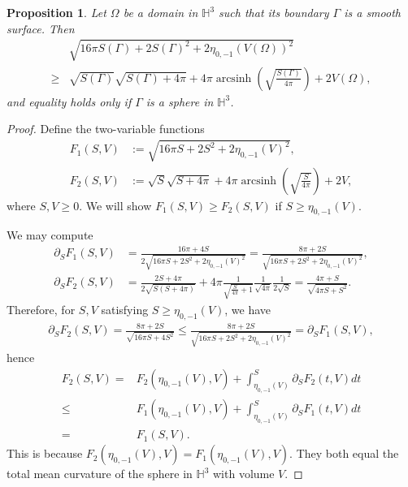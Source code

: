 \documentclass[10pt,a4paper]{amsart}
\newtheorem{prop}{Proposition}
\newcommand{\HH}{\mathbb{H}}
\newcommand{\p}{\partial}
\begin{document}
		\begin{prop}\label{prop:compare-inequality}
			Let $\Omega$ be a domain in $\HH^3$ such that its boundary $\Gamma$ is a smooth surface. Then
			\begin{align}
				\label{note2.prop}
				&\sqrt{16\pi S(\Gamma)+ 2 S(\Gamma)^2 + 2  \eta_{0,-1}(V(\Omega))^2} 
				\\
				\nonumber
				\geq
				&
				\sqrt{S(\Gamma)}\sqrt{S(\Gamma)+4\pi} + 4\pi \operatorname{arcsinh}\left( \sqrt{\frac{S(\Gamma)}{4\pi}} \right)
				+ 2 V(\Omega),
			\end{align}
			and equality holds only if $\Gamma$ is a sphere in $\HH^3$.
		\end{prop}

		\begin{proof}
			Define the two-variable functions
			\begin{align*}
				F_1(S,V)&:=\sqrt{16\pi S + 2S^2 + 2 \eta_{0,-1}(V)^2},
				\\
				F_2(S,V)&:=\sqrt{S}\sqrt{S+4\pi} + 4\pi \operatorname{arcsinh}\left( \sqrt{\frac{S}{4\pi}} \right) + 2V,
			\end{align*}
			where $S, V \geq 0$.
			We will show $F_1(S,V) \geq F_2(S,V)$ if $S \geq \eta_{0,-1}(V)$.
			
			We may compute
			\begin{align*}
				\p_{S}F_1(S,V) 
				&= \frac{16\pi + 4 S}{2\sqrt{16\pi S + 2S^2 + 2 \eta_{0,-1}(V)^2}}
				= \frac{8\pi + 2 S}{\sqrt{16\pi S + 2S^2 + 2 \eta_{0,-1}(V)^2}},
				\\
				\p_{S}F_2(S,V)
				&= \frac{2 S + 4\pi}{2\sqrt{S(S+4\pi)}}
				+
				4\pi \frac{1}{\sqrt{\frac{S}{4\pi}+1}} \frac{1}{\sqrt{4\pi}} \frac{1}{2 \sqrt{S}}
				= \frac{4\pi + S}{\sqrt{4\pi S + S^2}}.
			\end{align*}
			Therefore, for $S, V$ satisfying $S \geq \eta_{0,-1}(V)$, we have
			\begin{align}\label{Note2.tmp.compare}
				\p_{S}F_2(S,V) 
				= \frac{8\pi + 2S}{\sqrt{16\pi S + 4 S^2}}
				\leq \frac{8\pi + 2S}{\sqrt{16\pi S + 2S^2 + 2 \eta_{0,-1}(V)^2}} 
				= \p_{S}F_1(S,V),
			\end{align}
			hence
			\begin{align*}
				F_2(S,V) 
				= 
				&
				F_2(\eta_{0,-1}(V), V) + \int_{\eta_{0,-1}(V)}^{S} \p_{S}F_2(t,V) dt
				\\
				\leq
				&
				F_1(\eta_{0,-1}(V), V) + \int_{\eta_{0,-1}(V)}^{S} \p_{S}F_1(t,V) dt
				\\
				=
				&
				F_1(S,V).
			\end{align*}
			This is because $ F_2(\eta_{0,-1}(V), V) =F_1(\eta_{0,-1}(V), V)$. They both equal the total mean curvature of the sphere in $\HH^3$ with volume $V$.
			

\end{proof}
\end{document}
